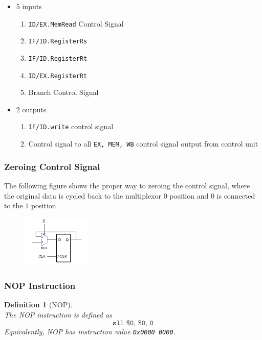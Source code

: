 \documentclass[12pt]{article}
\newtheorem{definition}{Definition}[section]
\theoremstyle{definition}
\begin{document}
\begin{itemize}
  \item 5 inputs
  \begin{enumerate}
    \item \texttt{ID/EX.MemRead} Control Signal
    \item \texttt{IF/ID.RegisterRs}
    \item \texttt{IF/ID.RegisterRt}
    \item \texttt{ID/EX.RegisterRt}
    \item Branch Control Signal
  \end{enumerate}
  \item 2 outputs
  \begin{enumerate}
  \item \texttt{IF/ID.write} control signal
  \item Control signal to all \texttt{EX, MEM, WB} control signal output from control unit
  \end{enumerate}
\end{itemize} 
\subsubsection{Zeroing Control Signal}
The following figure shows the proper way to zeroing the control signal, where the original data is cycled back to the multiplexor $0$ position and $0$ is connected to the $1$ position.
\begin{figure}[h]
\centering
\includegraphics[width = 0.3\textwidth]{13_4.png}
\end{figure}
\subsubsection{NOP Instruction}
\begin{definition}[NOP]
\hfill\\\normalfont The NOP instruction is defined as
\[
\texttt{sll \$0, \$0, 0}
\]
Equivalently, NOP has instruction value \texttt{0x0000 0000}.
\end{definition}
\end{document}
